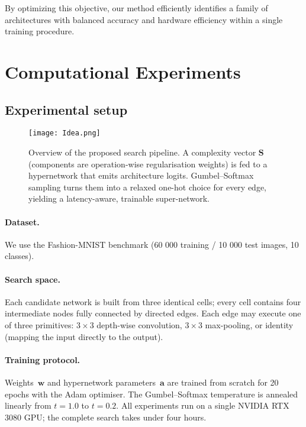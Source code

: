 \documentclass{article}
\begin{document}
By optimizing this objective, our method efficiently identifies a family of architectures with balanced accuracy and hardware efficiency within a single training procedure.



\section{Computational Experiments}

\subsection{Experimental setup}

\begin{figure}[!ht]
    \centering
    \texttt{[image: Idea.png]}
    \caption{Overview of the proposed search pipeline.  
    A complexity vector $\mathbf S$ (components are operation-wise regularisation weights) is fed to a hypernetwork that emits architecture logits.
    Gumbel–Softmax sampling turns them into a relaxed one-hot choice for every edge, yielding a latency-aware, trainable super-network.}
\end{figure}


\paragraph{Dataset.}
We use the Fashion-MNIST benchmark (60 000 training / 10 000 test images,
10 classes).

\paragraph{Search space.}
Each candidate network is built from three identical cells; every cell
contains four intermediate nodes fully connected by directed edges.
Each edge may execute one of three primitives:
\(3{\times}3\) depth-wise convolution, \(3{\times}3\) max-pooling, or identity
(mapping the input directly to the output).

\paragraph{Training protocol.}
Weights~$\boldsymbol w$ and hypernetwork parameters~$\boldsymbol a$ are trained
from scratch for 20 epochs with the Adam optimiser.
The Gumbel–Softmax temperature is annealed linearly from
\(t{=}1.0\) to \(t{=}0.2\).
All experiments run on a single NVIDIA RTX 3080 GPU; the complete search takes under four hours.
\end{document}
